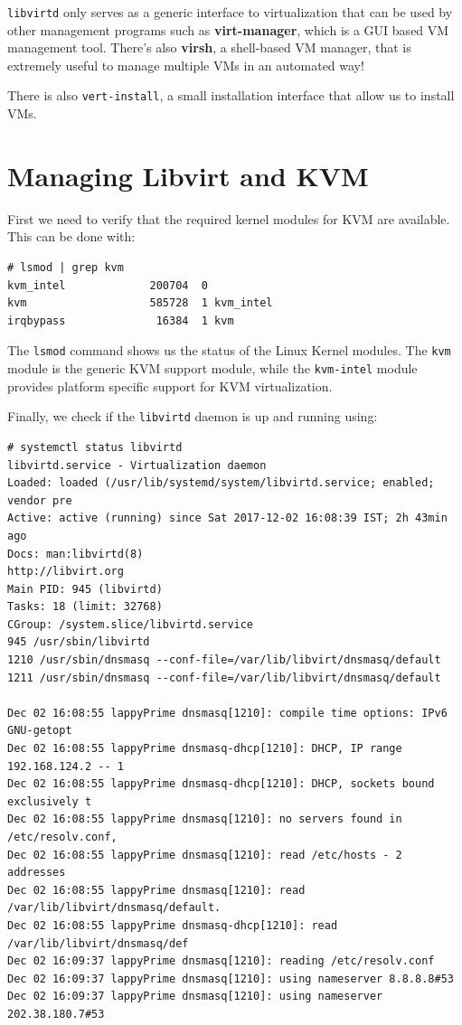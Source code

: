 \verb|libvirtd| only serves as a generic interface to virtualization that can be used by other management programs such as \textbf{virt-manager}, which is a GUI based VM management tool. There's also \textbf{virsh}, a shell-based VM manager, that is extremely useful to manage multiple VMs in an automated way! 

There is also \verb|vert-install|, a small installation interface that allow us to install VMs. 

	\section{Managing Libvirt and KVM}
First we need to verify that the required kernel modules for KVM are available. This can be done with:

\vspace{-15pt}
\begin{verbatim}
# lsmod | grep kvm
kvm_intel             200704  0
kvm                   585728  1 kvm_intel
irqbypass              16384  1 kvm
\end{verbatim}
\vspace{-10pt}

\noindent
The \verb|lsmod| command shows us the status of the Linux Kernel modules. The \verb|kvm| module is the generic KVM support module, while the \verb|kvm-intel| module provides platform specific support for KVM virtualization. 

Finally, we check if the \verb|libvirtd| daemon is up and running using:

\vspace{-15pt}
\begin{verbatim}
# systemctl status libvirtd
libvirtd.service - Virtualization daemon
Loaded: loaded (/usr/lib/systemd/system/libvirtd.service; enabled; vendor pre
Active: active (running) since Sat 2017-12-02 16:08:39 IST; 2h 43min ago
Docs: man:libvirtd(8)
http://libvirt.org
Main PID: 945 (libvirtd)
Tasks: 18 (limit: 32768)
CGroup: /system.slice/libvirtd.service
945 /usr/sbin/libvirtd
1210 /usr/sbin/dnsmasq --conf-file=/var/lib/libvirt/dnsmasq/default
1211 /usr/sbin/dnsmasq --conf-file=/var/lib/libvirt/dnsmasq/default

Dec 02 16:08:55 lappyPrime dnsmasq[1210]: compile time options: IPv6 GNU-getopt 
Dec 02 16:08:55 lappyPrime dnsmasq-dhcp[1210]: DHCP, IP range 192.168.124.2 -- 1
Dec 02 16:08:55 lappyPrime dnsmasq-dhcp[1210]: DHCP, sockets bound exclusively t
Dec 02 16:08:55 lappyPrime dnsmasq[1210]: no servers found in /etc/resolv.conf, 
Dec 02 16:08:55 lappyPrime dnsmasq[1210]: read /etc/hosts - 2 addresses
Dec 02 16:08:55 lappyPrime dnsmasq[1210]: read /var/lib/libvirt/dnsmasq/default.
Dec 02 16:08:55 lappyPrime dnsmasq-dhcp[1210]: read /var/lib/libvirt/dnsmasq/def
Dec 02 16:09:37 lappyPrime dnsmasq[1210]: reading /etc/resolv.conf
Dec 02 16:09:37 lappyPrime dnsmasq[1210]: using nameserver 8.8.8.8#53
Dec 02 16:09:37 lappyPrime dnsmasq[1210]: using nameserver 202.38.180.7#53
\end{verbatim}
\vspace{-10pt}

